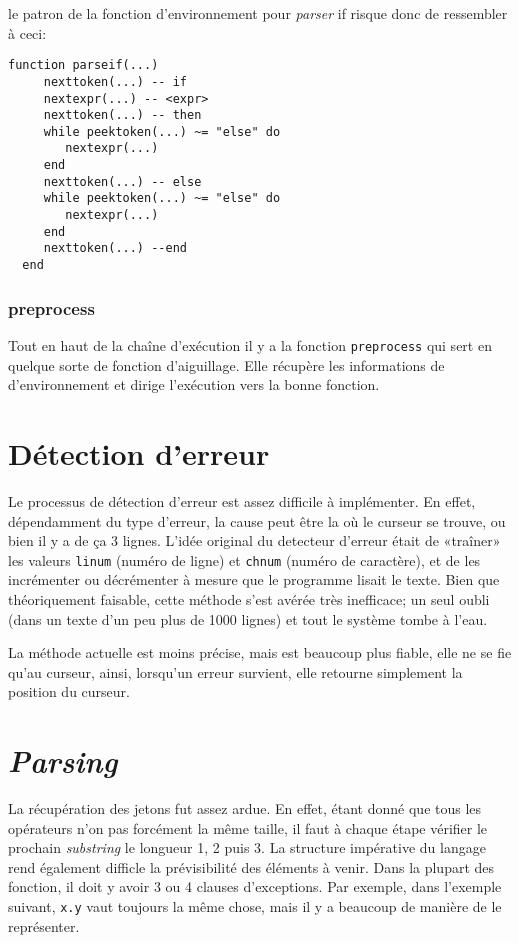 \documentclass{article}
\begin{document}
le patron de la fonction d'environnement pour \textit{parser} if risque donc de ressembler à ceci:

\begin{lstlisting}[style=lua]
  function parseif(...)
     nexttoken(...) -- if
     nextexpr(...) -- <expr>
     nexttoken(...) -- then
     while peektoken(...) ~= "else" do
        nextexpr(...)
     end
     nexttoken(...) -- else
     while peektoken(...) ~= "else" do
        nextexpr(...)
     end
     nexttoken(...) --end
  end
\end{lstlisting}

\subsubsection{preprocess}
Tout en haut de la chaîne d'exécution il y a la fonction \texttt{preprocess} qui sert en quelque sorte de fonction d'aiguillage. Elle récupère les informations de d'environnement et dirige l'exécution vers la bonne fonction.

\section{Détection d'erreur}
Le processus de détection d'erreur est assez difficile à implémenter. En effet, dépendamment du type d'erreur, la cause peut être la où le curseur se trouve, ou bien il y a de ça 3 lignes. L'idée original du detecteur d'erreur était de «traîner» les valeurs \texttt{linum} (numéro de ligne) et \texttt{chnum} (numéro de caractère), et de les incrémenter ou décrémenter à mesure que le programme lisait le texte. Bien que théoriquement faisable, cette méthode s'est avérée très inefficace; un seul oubli (dans un texte d'un peu plus de 1000 lignes) et tout le système tombe à l'eau.

La méthode actuelle est moins précise, mais est beaucoup plus fiable, elle ne se fie qu'au curseur, ainsi, lorsqu'un erreur survient, elle retourne simplement la position du curseur.

\section{\textit{Parsing}}
La récupération des jetons fut assez ardue. En effet, étant donné que tous les opérateurs n'on pas forcément la même taille, il faut à chaque étape vérifier le prochain \textit{substring} le longueur 1, 2 puis 3. La structure impérative du langage rend également difficle la prévisibilité des éléments à venir. Dans la plupart des fonction, il doit y avoir 3 ou 4 clauses d'exceptions. Par exemple, dans l'exemple suivant, \texttt{x.y} vaut toujours la même chose, mais il y a beaucoup de manière de le représenter.
\end{document}
